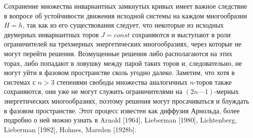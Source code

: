 \documentclass[twoside, a4paper]{article}
\begin{document}
Сохранение множества инвариантных замкнутых кривых имеет важное следствие в вопросе об устойчивости движения исходной системы на каждом многообразии $H=h$, так как из его существования следует, что некоторые из исходных двумерных инвариантных торов $J=const$ сохраняются и выступают в роли ограничителей на трехмерных энергетических многообразиях, через которые не могут перейти решения. Возмущенные решения либо располагаются на этих торах, либо попадают в ловушку между парой таких торов и, следовательно, не могут уйти в фазовом пространстве сколь угодно далеко. Заметим, что хотя в системах с $n>3$ степенями свободы множества аналогичных $n$-торов также сохраняются, они уже не могут служить ограничителями на $(2n — 1)$-мерных энергетических многообразиях, поэтому решения могут просачиваться и блуждать в фазовом пространстве. Этот процесс известен как диффузия Арнольда, более подробно о ней можно узнать в Arnold [1964], Lieberman [1980], Lichtenberg, Lieberman [1982], Holmes, Marsden [1928b].
\end{document}

